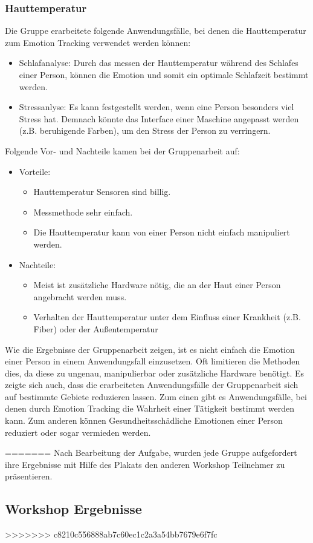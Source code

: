 \subsubsection{Hauttemperatur}
Die Gruppe erarbeitete folgende Anwendungsfälle, bei denen die Hauttemperatur zum Emotion Tracking verwendet werden können:
\begin{itemize}
	\item Schlafanalyse: Durch das messen der Hauttemperatur während des Schlafes einer Person, können die Emotion  und somit ein optimale Schlafzeit bestimmt werden.
	\item Stressanlyse: Es kann festgestellt werden, wenn eine Person besonders viel Stress hat. Demnach könnte das Interface einer Maschine angepasst werden (z.B. beruhigende Farben), um den Stress der Person zu verringern.
\end{itemize}
Folgende Vor- und Nachteile kamen bei der Gruppenarbeit auf:
\begin{itemize}
	\item Vorteile:
	\begin{itemize}
		\item Hauttemperatur Sensoren sind billig.
		\item Messmethode sehr einfach.	 
		\item Die Hauttemperatur kann von einer Person nicht einfach manipuliert werden.
	\end{itemize}
	\item Nachteile:
	\begin{itemize}
		\item Meist ist zusätzliche Hardware nötig, die an der Haut einer Person angebracht werden muss.
		\item Verhalten der Hauttemperatur unter dem Einfluss einer Krankheit (z.B. Fiber) oder der Außentemperatur
	\end{itemize}
\end{itemize}

Wie die Ergebnisse der Gruppenarbeit zeigen, ist es nicht einfach die Emotion einer Person in einem Anwendungsfall einzusetzen. Oft limitieren die Methoden dies, da diese zu ungenau, manipulierbar oder zusätzliche Hardware benötigt. Es zeigte sich auch, dass die erarbeiteten Anwendungsfälle der Gruppenarbeit sich auf bestimmte Gebiete reduzieren lassen. Zum einen gibt es Anwendungsfälle, bei denen durch Emotion Tracking die Wahrheit einer Tätigkeit bestimmt werden kann. Zum anderen können Gesundheitsschädliche Emotionen einer Person reduziert oder sogar vermieden werden. 

=======
Nach Bearbeitung der Aufgabe, wurden jede Gruppe aufgefordert ihre Ergebnisse mit Hilfe des Plakats den anderen Workshop Teilnehmer zu präsentieren.

\subsection{Workshop Ergebnisse}\label{Umsetzung_Anwendungsfaelle_Ergebnisse}
>>>>>>> c8210c556888ab7c60ec1c2a3a54bb7679e6f7fc
